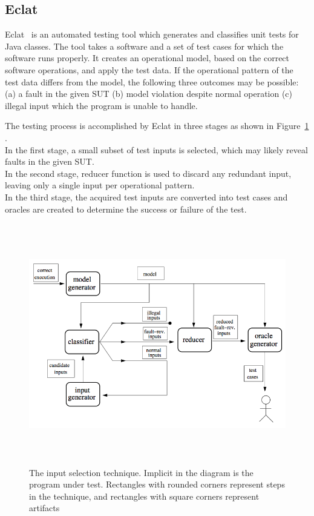 \subsection{Eclat}
Eclat~\cite{pacheco2005eclat} is an automated testing tool which generates and classifies unit tests for Java classes. The tool takes a software and a set of test cases for which the software runs properly. It creates an operational model, based on the correct software operations, and apply the test data. If the operational pattern of the test data differs from the model, the following three outcomes may be possible: (a) a fault in the given SUT (b) model violation despite normal operation (c) illegal input which the program is unable to handle.

The testing process is accomplished by Eclat in three stages as shown in Figure~\ref{fig:eclat} . \\
In the first stage, a small subset of test inputs is selected, which may likely reveal faults in the given SUT. \\
In the second stage, reducer function is used to discard any redundant input, leaving only a single input per operational pattern. \\
In the third stage, the acquired test inputs are converted into test cases and oracles are created to determine the success or failure of the test.

\begin{figure}[h]
	\centering
	\includegraphics[width=15cm, height=10.5cm]{chapter2/eclat_working.png}
	\caption{The input selection technique. Implicit in the diagram is the program under test. Rectangles with rounded corners represent steps in the technique, and rectangles with square corners represent artifacts~\cite{pacheco2005eclat}}
	\label{fig:eclat}
\end{figure}


